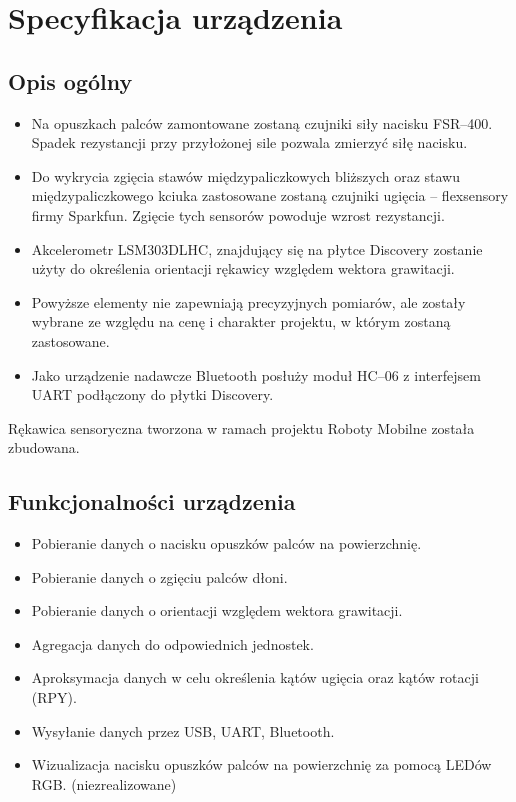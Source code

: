 \documentclass[10pt,a4paper]{article}
\begin{document}
\newpage
\section{Specyfikacja urządzenia}

\subsection{Opis ogólny}
\begin{itemize}
\item Na opuszkach palców zamontowane zostaną czujniki siły nacisku FSR--400. Spadek rezystancji przy przyłożonej sile pozwala zmierzyć siłę nacisku.
\item Do wykrycia zgięcia stawów międzypaliczkowych bliższych oraz stawu międzypaliczkowego kciuka zastosowane zostaną czujniki ugięcia -- flexsensory firmy Sparkfun. Zgięcie tych sensorów powoduje wzrost rezystancji.
\item Akcelerometr LSM303DLHC, znajdujący się na płytce Discovery zostanie użyty do określenia orientacji rękawicy względem wektora grawitacji.
\item Powyższe elementy nie zapewniają precyzyjnych pomiarów, ale zostały wybrane ze względu na cenę i charakter projektu, w którym zostaną zastosowane.
\item Jako urządzenie nadawcze Bluetooth posłuży moduł HC--06 z interfejsem UART podłączony do płytki Discovery.
\end{itemize}
Rękawica sensoryczna tworzona w ramach projektu Roboty Mobilne została zbudowana.

\subsection{Funkcjonalności urządzenia}
\begin{itemize}
\item Pobieranie danych o nacisku opuszków palców na powierzchnię.
\item Pobieranie danych o zgięciu palców dłoni.
\item Pobieranie danych o orientacji względem wektora grawitacji.
\item Agregacja danych do odpowiednich jednostek.
\item Aproksymacja danych w celu określenia kątów ugięcia oraz kątów rotacji (RPY).
\item Wysyłanie danych przez USB, UART, Bluetooth.
\item Wizualizacja nacisku opuszków palców na powierzchnię za pomocą LEDów RGB. (niezrealizowane)
\end{itemize}
\end{document}
